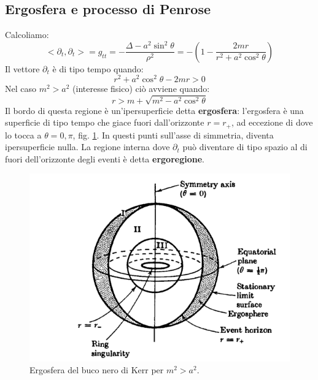\subsection{Ergosfera e processo di Penrose}
Calcoliamo:
\begin{equation*}
    <\partial_t, \partial_t > = g_{tt} = - \frac{\Delta - a^2\sin^2\theta}{\rho^2}= - \left(1 - \frac{2mr}{r^2+ a^2\cos^2\theta} \right)
\end{equation*}
Il vettore $\partial_t$ è di tipo tempo quando:
\begin{equation*}
    r^2 +a^2\cos^2\theta -2mr > 0
\end{equation*}
Nel caso $m^2 > a^2$ (interesse fisico) ciò avviene quando:
\begin{equation*}
    r > m + \sqrt{m^2 - a^2\cos^2\theta}
\end{equation*}
Il bordo di questa regione è un'ipersuperficie detta \textbf{ergosfera}: l'ergosfera è una superficie di tipo tempo che giace fuori dall'orizzonte $r=r_+$, ad eccezione di dove lo tocca a $\theta = 0, \pi$,  fig. \ref{fig.ergosfera}. In questi punti sull'asse di simmetria, diventa ipersuperficie nulla.
La regione interna dove $\partial_t$ può diventare di tipo spazio al di fuori dell'orizzonte degli eventi è detta \textbf{ergoregione}.


\begin{figure}
    \centering
    \includegraphics[scale=0.5]{immagini/ergosfera.png}
    \caption{Ergosfera del buco nero di Kerr per $m^2 > a^2$.}
    \label{fig.ergosfera}
\end{figure}

